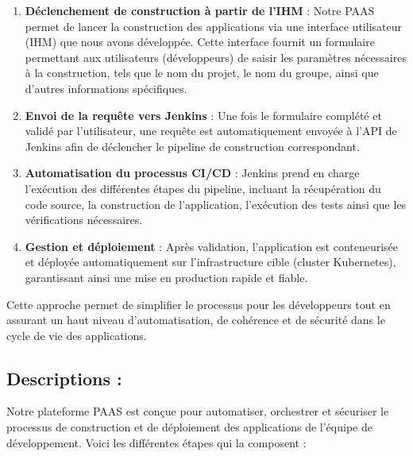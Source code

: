 \begin{enumerate}
    \item \textbf{Déclenchement de construction à partir de l’IHM} :  
    Notre PAAS permet de lancer la construction des applications via une interface utilisateur (IHM) que nous avons développée. Cette interface fournit un formulaire permettant aux utilisateurs (développeurs) de saisir les paramètres nécessaires à la construction, tels que le nom du projet, le nom du groupe, ainsi que d’autres informations spécifiques.

    \item \textbf{Envoi de la requête vers Jenkins} :  
    Une fois le formulaire complété et validé par l’utilisateur, une requête est automatiquement envoyée à l’API de Jenkins afin de déclencher le pipeline de construction correspondant.

    \item \textbf{Automatisation du processus CI/CD} :  
    Jenkins prend en charge l’exécution des différentes étapes du pipeline, incluant la récupération du code source, la construction de l’application, l’exécution des tests ainsi que les vérifications nécessaires.

    \item \textbf{Gestion et déploiement} :  
    Après validation, l’application est conteneurisée et déployée automatiquement sur l’infrastructure cible (cluster Kubernetes), garantissant ainsi une mise en production rapide et fiable.

\end{enumerate}

Cette approche permet de simplifier le processus pour les développeurs tout en assurant un haut niveau d’automatisation, de cohérence et de sécurité dans le cycle de vie des applications.
\subsection{Descriptions :}

Notre plateforme PAAS est conçue pour automatiser, orchestrer et sécuriser le processus de construction et de déploiement des applications de l’équipe de développement. Voici les différentes étapes qui la composent :

